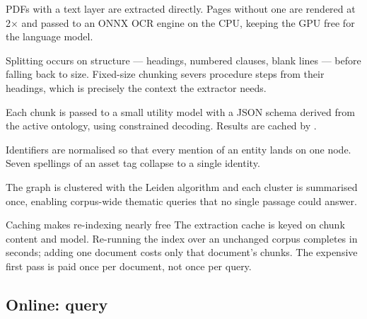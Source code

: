 \begin{description}[leftmargin=0pt,style=nextline]
\item[Rasterisation and OCR.] PDFs with a text layer are extracted directly.
Pages without one are rendered at 2$\times$ and passed to an ONNX OCR engine on
the CPU, keeping the GPU free for the language model.
\item[Semantic chunking.] Splitting occurs on structure --- headings, numbered
clauses, blank lines --- before falling back to size. Fixed-size chunking
severs procedure steps from their headings, which is precisely the context the
extractor needs.
\item[Typed extraction.] Each chunk is passed to a small utility model with a
JSON schema derived from the active ontology, using constrained decoding.
Results are cached by .
\item[Canonicalisation.] Identifiers are normalised so that every mention of an
entity lands on one node. Seven spellings of an asset tag collapse to a single
identity.
\item[Community detection.] The graph is clustered with the Leiden algorithm
and each cluster is summarised once, enabling corpus-wide thematic queries that
no single passage could answer.
\end{description}

\begin{keybox}{Caching makes re-indexing nearly free}
The extraction cache is keyed on chunk content and model. Re-running the index
over an unchanged corpus completes in seconds; adding one document costs only
that document's chunks. The expensive first pass is paid once per document, not
once per query.
\end{keybox}

\subsection{Online: query}

